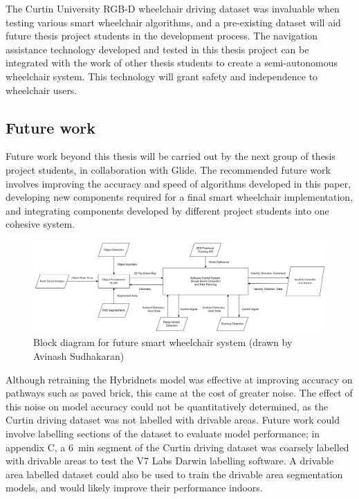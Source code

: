 The Curtin University RGB-D wheelchair driving dataset was invaluable
when testing various smart wheelchair algorithms, and a pre-existing dataset will
aid future thesis project students in the development process.
The navigation assistance technology developed and tested in this thesis project
can be integrated with the work of other thesis students to create a semi-autonomous
wheelchair system. This technology will grant safety and independence
to wheelchair users.

\pagebreak
\subsection{Future work}
\label{sec:future_work}
Future work beyond this thesis will be carried out by the next
group of thesis project students, in collaboration with Glide.
The recommended future work involves improving the accuracy
and speed of algorithms developed in this paper, developing
new components required for a final smart wheelchair implementation,
and integrating components developed by different project students into 
one cohesive system.

\begin{figure}[b]
    \centering
    \includegraphics[width=\linewidth]{images/top_level_software_pipeline.png}
    \caption{Block diagram for future smart wheelchair system (drawn by Avinash Sudhakaran)}
    \label{fig:top_level_software_pipeline}
\end{figure}

Although retraining the Hybridnets model was effective at improving
accuracy on pathways such as paved brick, this came at the cost
of greater noise. The effect of this noise on model accuracy
could not be quantitatively determined, as the Curtin driving dataset
was not labelled with drivable areas. Future work could involve labelling sections of the
dataset to evaluate model performance; in appendix C, a \SI{6}{\minute} segment
of the Curtin driving dataset was coarsely labelled with drivable areas to
test the V7 Labs Darwin labelling software. A drivable area labelled dataset could
also be used to train the drivable area segmentation models,
and would likely improve their performance indoors.

